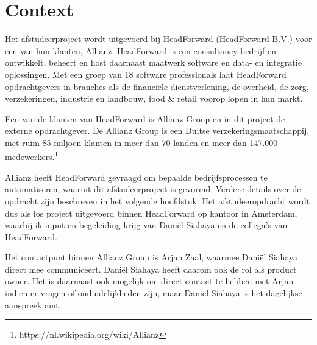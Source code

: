 \chapter{Context}
Het afstudeerproject wordt uitgevoerd bij HeadForward (HeadForward B.V.) voor een van hun klanten, Allianz. HeadForward is een consultancy bedrijf en ontwikkelt, beheert en host daarnaast maatwerk software en data- en integratie oplossingen. Met een groep van 18 software professionals laat HeadForward opdrachtgevers in branches als de financiële dienstverlening, de overheid, de zorg, verzekeringen, industrie en landbouw, food \& retail voorop lopen in hun markt.\par

Een van de klanten van HeadForward is Allianz Group en in dit project de externe opdrachtgever. De Allianz Group is een Duitse verzekeringsmaatschappij, met ruim 85 miljoen klanten in meer dan 70 landen en meer dan 147.000 medewerkers.\footnote{https://nl.wikipedia.org/wiki/Allianz} \par

Allianz heeft HeadForward gevraagd om bepaalde bedrijfsprocessen te automatiseren, waaruit dit afstudeerproject is gevormd. Verdere details over de opdracht zijn beschreven in het volgende hoofdstuk. Het afstudeeropdracht wordt dus als los project uitgevoerd binnen HeadForward op kantoor in Amsterdam, waarbij ik input en begeleiding krijg van Dani\"el Siahaya en de collega's van HeadForward.\par

Het contactpunt binnen Allianz Group is Arjan Zaal, waarmee Dani\"el Siahaya direct mee communiceert. Dani\"el Siahaya heeft daarom ook de rol als product owner. Het is daarnaast ook mogelijk om direct contact te hebben met Arjan indien er vragen of onduidelijkheden zijn, maar Dani\"el Siahaya is het dagelijkse aanspreekpunt.\par